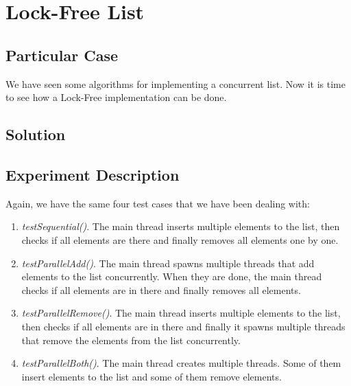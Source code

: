 \section{\textbf{Lock-Free List}}
\subsection{Particular Case}
\par
We have seen some algorithms for implementing a concurrent list. Now it is time
to see how a Lock-Free implementation can be done.
\par
\subsection{Solution}
\par
\par
\subsection{Experiment Description}
\par
Again, we have the same four test cases that we have been dealing with:
\par
\begin{enumerate}
\item \textit{testSequential()}. The main thread inserts multiple elements to
the list, then checks if all elements are there and finally removes all elements
one by one.
\item \textit{testParallelAdd()}. The main thread spawns multiple threads that
add elements to the list concurrently. When they are done, the main thread
checks if all elements are in there and finally removes all elements.
\item \textit{testParallelRemove()}. The main thread inserts multiple elements
to the list, then checks if all elements are in there and finally it spawns
multiple threads that remove the elements from the list concurrently.
\item \textit{testParallelBoth()}. The main thread creates multiple threads.
Some of them insert elements to the list and some of them remove elements.
\end{enumerate}
\par
